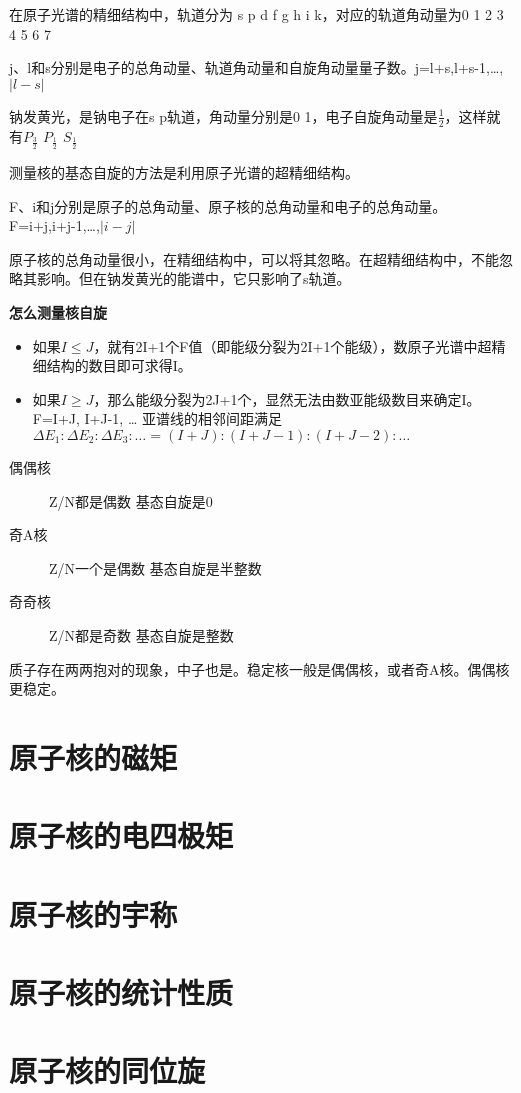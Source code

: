 在原子光谱的精细结构中，轨道分为 s p d f g h i k，对应的轨道角动量为0 1 2 3 4 5 6 7

j、l和s分别是电子的总角动量、轨道角动量和自旋角动量量子数。j=l+s,l+s-1,\dots,$\left\lvert l-s \right\rvert $

钠发黄光，是钠电子在s p轨道，角动量分别是0 1，电子自旋角动量是$\frac{1}{2}$，这样就有$P_{\frac{3}{2}}$ $P_{\frac{1}{2}}$ $S_{\frac{1}{2}}$ 

测量核的基态自旋的方法是利用原子光谱的超精细结构。

F、i和j分别是原子的总角动量、原子核的总角动量和电子的总角动量。F=i+j,i+j-1,\dots,$\left\lvert i-j \right\rvert $

原子核的总角动量很小，在精细结构中，可以将其忽略。在超精细结构中，不能忽略其影响。但在钠发黄光的能谱中，它只影响了s轨道。

\textbf{怎么测量核自旋}

\begin{itemize}
    \item 如果$I\leq J$，就有2I+1个F值（即能级分裂为2I+1个能级），数原子光谱中超精细结构的数目即可求得I。
    \item 如果$I\geq J$，那么能级分裂为2J+1个，显然无法由数亚能级数目来确定I。F=I+J, I+J-1, … 亚谱线的相邻间距满足$\Delta E_1 : \Delta E_2 : \Delta E_3 : \dots = (I+J) : (I+J-1) : (I+J-2) : \dots $
\end{itemize}

\begin{description}
    \item[偶偶核] Z/N都是偶数  基态自旋是0
    \item[奇A核] Z/N一个是偶数 基态自旋是半整数
    \item[奇奇核] Z/N都是奇数  基态自旋是整数
\end{description}

质子存在两两抱对的现象，中子也是。稳定核一般是偶偶核，或者奇A核。偶偶核更稳定。

\section{原子核的磁矩}

\section{原子核的电四极矩}

\section{原子核的宇称}

\section{原子核的统计性质}

\section{原子核的同位旋}

\clearpage
